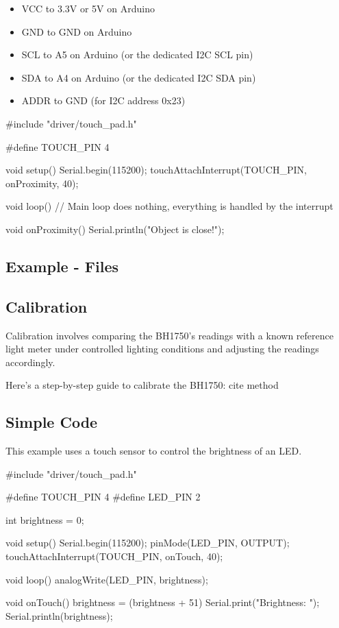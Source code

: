 \begin{itemize}
	\item VCC to 3.3V or 5V on Arduino
	\item GND to GND on Arduino
	\item SCL to A5 on Arduino (or the dedicated I2C SCL pin)
	\item SDA to A4 on Arduino (or the dedicated I2C SDA pin)
	\item ADDR to GND (for I2C address 0x23)
\end{itemize}



\begin{Arduino}
	#include "driver/touch_pad.h"
	
	#define TOUCH_PIN 4
	
	void setup() {
		Serial.begin(115200);
		touchAttachInterrupt(TOUCH_PIN, onProximity, 40);
	}
	
	void loop() {
		// Main loop does nothing, everything is handled by the interrupt
	}
	
	void onProximity() {
		Serial.println("Object is close!");
	}
	
\end{Arduino}



\subsection{Example - Files}



\subsection{Calibration}

Calibration involves comparing the BH1750's readings with a known reference light meter under controlled lighting conditions and adjusting the readings accordingly.

Here’s a step-by-step guide to calibrate the BH1750:
cite method

\subsection{Simple Code}
This example uses a touch sensor to control the brightness of an LED.

\begin{Arduino}
	#include "driver/touch_pad.h"
	
	#define TOUCH_PIN 4
	#define LED_PIN 2
	
	int brightness = 0;
	
	void setup() {
		Serial.begin(115200);
		pinMode(LED_PIN, OUTPUT);
		touchAttachInterrupt(TOUCH_PIN, onTouch, 40);
	}
	
	void loop() {
		analogWrite(LED_PIN, brightness);
	}
	
	void onTouch() {
		brightness = (brightness + 51) %
		Serial.print("Brightness: ");
		Serial.println(brightness);
	}
	
	
\end{Arduino}

